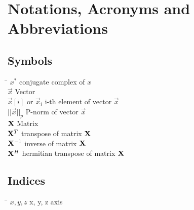 \chapter*{Notations, Acronyms and Abbreviations}
\label{sec:symbols}

\section*{Symbols}

\begin{tabbing}
 \hspace*{3cm} \= \kill
  $x^*$ \> conjugate complex of $x$\\[0.5ex]
  $\vec{x}$  \>Vector \\[0.5ex] 					
  $\vec{x}[i]$ or $\vec{x}_i$  \> i-th element of vector $\vec{x}$ \\[0.5ex]
  $||\vec{x}||_p$ \>P-norm of vector $\vec{x}$\\[0.5ex]	
  $\mathbf{X}$    \> Matrix \\[0.5ex]
  $\mathbf{X}^T$  \> transpose of matrix  $\mathbf{X}$\\[0.5ex]
  $\mathbf{X}^{-1}$  \> inverse of matrix $\mathbf{X}$ \\[0.5ex]
  $\mathbf{X}^{H}$  \> hermitian transpose of matrix $\mathbf{X}$\\[0.5ex]
\end{tabbing}

\section*{Indices}
\begin{tabbing}
 \hspace*{3cm}  \= \kill
 $x, y, z$ \> x, y, z axis \\[0.5ex]
\end{tabbing}

